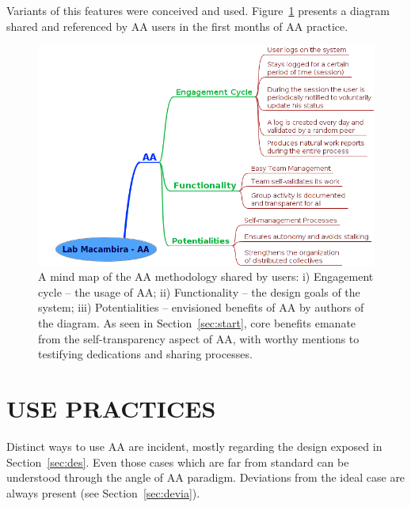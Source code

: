 \documentclass[12pt,fleqn]{article}
\begin{document}
Variants of this features were conceived and used.
Figure~\ref{fig:consult} presents a diagram shared and referenced by AA
users in the first months of AA practice.

\begin{figure}[!htbp] %
\vspace{-2pt}
\begin{center}
    \includegraphics[width=.7\textwidth]{../imgs/aaFirstMethodology}
    \caption{A mind map of the AA methodology shared by users:
	i) Engagement cycle – the usage of AA;
	ii) Functionality – the design goals of the system;
	iii) Potentialities – envisioned benefits of AA by authors of the diagram.
	As seen in Section~\ref{sec:start},
	core benefits emanate from the self-transparency aspect of AA,
	with worthy mentions to testifying dedications and sharing processes.} 
    \label{fig:consult}
\end{center}
\end{figure}

\section{USE PRACTICES}\label{sec:use}
Distinct ways to use AA are incident,
mostly regarding the design exposed in Section~\ref{sec:des}.
Even those cases which are far from standard can be understood through the angle of AA paradigm.
Deviations from the ideal case are always present (see Section~\ref{sec:devia}).
\end{document}
